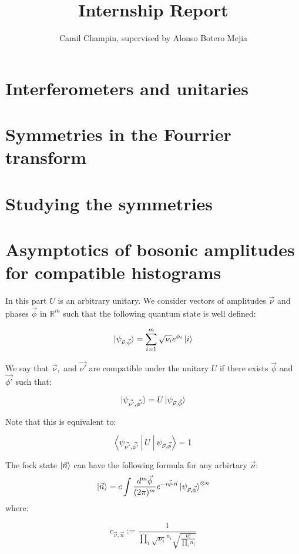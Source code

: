 \documentclass{article}
\title{Internship Report}
\author{Camil Champin, supervised by Alonso Botero Mejia}
\begin{document}
\maketitle

\section{Interferometers and unitaries}



\section{Symmetries in the Fourrier transform}



\section{Studying  the symmetries}



\section{Asymptotics of bosonic amplitudes for compatible histograms}

In this part $U$ is an arbitrary unitary. We consider vectors of amplitudes $\vec{\nu}$ and phases $\vec{\phi}$ in $\mathbb{R}^{m}$ such that the following quantum state is well defined:

\[\ket{\psi_{\vec{\nu},\vec{\phi}}} = \sum_{i = 1}^{m} \sqrt{\nu_{i}} e^{\phi_{i}} \ket{i} \]

\begin{definition}[Compatibility]
  We say that $\vec{\nu}, $ and $\vec{\nu'}$ are compatible under the unitary $U$ if there exists $\vec{\phi}$ and $\vec{\phi'}$ such that:

  \[\ket{\psi_{\vec{\nu'},\vec{\phi'}}} = U \ket{\psi_{\vec{\nu},\vec{\phi}}}\]
\end{definition}

Note that this is equivalent to:

\[\Braket{\psi_{\vec{\nu'},\vec{\phi'}} | U | \psi_{\vec{\nu},\vec{\phi}}} = 1\]

\begin{prop}
  The fock state $\ket{\vec{n}}$ can have the following formula for any arbirtary $\vec{\nu}$:
  \[\ket{\vec{n}} = c \int \frac{d^{m}\vec{\phi}}{(2\pi)^{m}} e^{-i \vec{\phi} \cdot \vec{n}} \ket{\psi_{\vec{\nu},\vec{\phi}}}^{\otimes n}\]
where:

\[c_{\vec{\nu},\vec{n}} := \frac{1}{\prod_{i} \sqrt{\nu_{i}}^{n_{i}} \sqrt{\frac{n!}{\prod_{i} n_{i}}}} \]
\end{prop}
\end{document}
